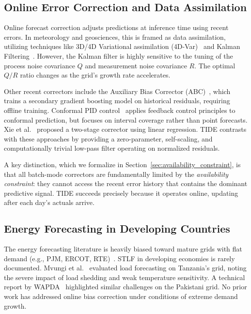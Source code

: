 \documentclass[11pt,letterpaper]{article}
\begin{document}
\subsection{Online Error Correction and Data Assimilation}
Online forecast correction adjusts predictions at inference time using recent errors. In meteorology and geosciences, this is framed as data assimilation, utilizing techniques like 3D/4D Variational assimilation (4D-Var)~\cite{farchi2024neural} and Kalman Filtering~\cite{harvey1989forecasting}. However, the Kalman filter is highly sensitive to the tuning of the process noise covariance $Q$ and measurement noise covariance $R$. The optimal $Q/R$ ratio changes as the grid's growth rate accelerates.

Other recent correctors include the Auxiliary Bias Corrector (ABC)~\cite{mouatadid2023abc}, which trains a secondary gradient boosting model on historical residuals, requiring offline training. Conformal PID control~\cite{angelopoulos2023conformal} applies feedback control principles to conformal prediction, but focuses on interval coverage rather than point forecasts. Xie et al.~\cite{xie2025two} proposed a two-stage corrector using linear regression. TIDE contrasts with these approaches by providing a zero-parameter, self-scaling, and computationally trivial low-pass filter operating on normalized residuals.

A key distinction, which we formalize in Section~\ref{sec:availability_constraint}, is that all batch-mode correctors are fundamentally limited by the \emph{availability constraint}: they cannot access the recent error history that contains the dominant predictive signal. TIDE succeeds precisely because it operates online, updating after each day's actuals arrive.

\subsection{Energy Forecasting in Developing Countries}
The energy forecasting literature is heavily biased toward mature grids with flat demand (e.g., PJM, ERCOT, RTE)~\cite{sobhani2020electricity}. STLF in developing economies is rarely documented. Mvungi et al.~\cite{mvungi2021load} evaluated load forecasting on Tanzania's grid, noting the severe impact of load shedding and weak temperature sensitivity. A technical report by WAPDA~\cite{wapda2020load} highlighted similar challenges on the Pakistani grid. No prior work has addressed online bias correction under conditions of extreme demand growth.
\end{document}
